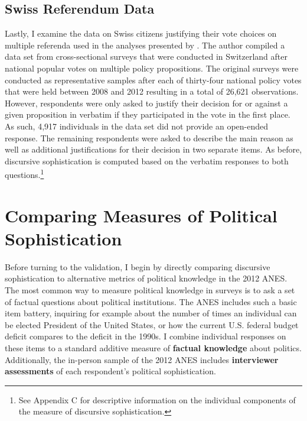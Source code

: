 \documentclass[12pt]{article}
\begin{document}



\subsection*{Swiss Referendum Data}

Lastly, I examine the data on Swiss citizens justifying their vote choices on multiple referenda used in the analyses presented by \citet{colombo2016justifications}. The author compiled a data set from cross-sectional surveys that were conducted in Switzerland after national popular votes on multiple policy propositions. The original surveys were conducted as representative samples after each of thirty-four national policy votes that were held between 2008 and 2012 resulting in a total of 26,621 observations. However, respondents were only asked to justify their decision for or against a given proposition in verbatim if they participated in the vote in the first place. As such, 4,917 individuals in the data set did not provide an open-ended response. The remaining respondents were asked to describe the main reason as well as additional justifications for their decision in two separate items. As before, discursive sophistication is computed based on the verbatim responses to both questions.\footnote{See Appendix C for descriptive information on the individual components of the measure of discursive sophistication.}



\section*{Comparing Measures of Political Sophistication}


Before turning to the validation, I begin by directly comparing discursive sophistication to alternative metrics of political knowledge in the 2012 ANES. The most common way to measure political knowledge in surveys is to ask a set of factual questions about political institutions. The ANES includes such a basic item battery, inquiring for example about the number of times an individual can be elected President of the United States, or how the current U.S. federal budget deficit compares to the deficit in the 1990s. I combine individual responses on these items to a standard additive measure of \textbf{factual knowledge} about politics. Additionally, the in-person sample of the 2012 ANES includes \textbf{interviewer assessments} of each respondent's political sophistication.
\end{document}
